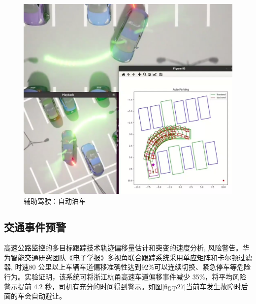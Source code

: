 \begin{figure}[htbp] %
	\centering
	\includegraphics[width=1\textwidth]{p38} %
	\caption{辅助驾驶：自动泊车} %
	\label{fig:p38} %
\end{figure}




\subsection{交通事件预警}



高速公路监控的多目标跟踪技术轨迹偏移量估计和突变的速度分析, 风险警告。华为智能交通研究团队《电子学报》\cite{huawei2020highway}多视角联合跟踪系统采用单应矩阵和卡尔顿过滤器, 时速80 公里以上车辆车道偏移准确性达到92\%可以连续切换、紧急停车等危险行为。实验证明，该系统可将浙江杭甬高速车道偏移事件减少 35\%，将平均风险警示提前 4.2 秒，司机有充分的时间得到警示。如图\ref{fig:p27}当前车发生故障时后面的车会自动避让。





